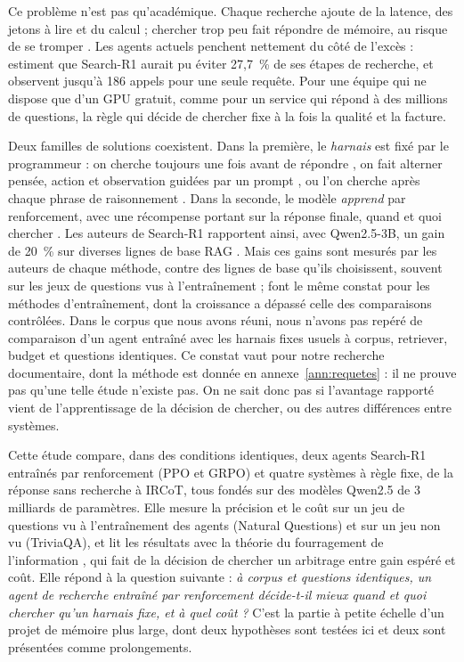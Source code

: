 \documentclass[11pt,a4paper]{article}
\begin{document}
Ce problème n'est pas qu'académique. Chaque recherche ajoute de la latence, des jetons à lire et du calcul ; chercher trop peu fait répondre de mémoire, au risque de se tromper \citep{mallen2022when}. Les agents actuels penchent nettement du côté de l'excès : \citet{wu2025search} estiment que Search-R1 aurait pu éviter 27,7~\% de ses étapes de recherche, et \citet{pezzuti2026how} observent jusqu'à 186 appels pour une seule requête. Pour une équipe qui ne dispose que d'un GPU gratuit, comme pour un service qui répond à des millions de questions, la règle qui décide de chercher fixe à la fois la qualité et la facture.

Deux familles de solutions coexistent. Dans la première, le \emph{harnais} est fixé par le programmeur : on cherche toujours une fois avant de répondre \citep{lewis2020retrieval}, on fait alterner pensée, action et observation guidées par un prompt \citep{yao2022react}, ou l'on cherche après chaque phrase de raisonnement \citep{trivedi2022interleaving}. Dans la seconde, le modèle \emph{apprend} par renforcement, avec une récompense portant sur la réponse finale, quand et quoi chercher \citep{jin2025search,song2025r1,chen2025research}. Les auteurs de Search-R1 rapportent ainsi, avec Qwen2.5-3B, un gain de 20~\% sur diverses lignes de base RAG \citep{jin2025search}. Mais ces gains sont mesurés par les auteurs de chaque méthode, contre des lignes de base qu'ils choisissent, souvent sur les jeux de questions vus à l'entraînement ; \citet{zhao2026retrieval} font le même constat pour les méthodes d'entraînement, dont la croissance a dépassé celle des comparaisons contrôlées. Dans le corpus que nous avons réuni, nous n'avons pas repéré de comparaison d'un agent entraîné avec les harnais fixes usuels à corpus, retriever, budget et questions identiques. Ce constat vaut pour notre recherche documentaire, dont la méthode est donnée en annexe~\ref{ann:requetes} : il ne prouve pas qu'une telle étude n'existe pas. On ne sait donc pas si l'avantage rapporté vient de l'apprentissage de la décision de chercher, ou des autres différences entre systèmes.

Cette étude compare, dans des conditions identiques, deux agents Search-R1 entraînés par renforcement (PPO et GRPO) et quatre systèmes à règle fixe, de la réponse sans recherche à IRCoT, tous fondés sur des modèles Qwen2.5 de 3 milliards de paramètres. Elle mesure la précision et le coût sur un jeu de questions vu à l'entraînement des agents (Natural Questions) et sur un jeu non vu (TriviaQA), et lit les résultats avec la théorie du fourragement de l'information \citep{pirolli1999information}, qui fait de la décision de chercher un arbitrage entre gain espéré et coût. Elle répond à la question suivante : \emph{à corpus et questions identiques, un agent de recherche entraîné par renforcement décide-t-il mieux quand et quoi chercher qu'un harnais fixe, et à quel coût ?} C'est la partie à petite échelle d'un projet de mémoire plus large, dont deux hypothèses sont testées ici et deux sont présentées comme prolongements.
\end{document}
